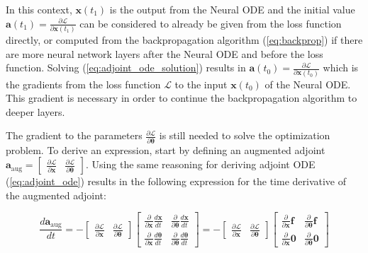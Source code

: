 \documentclass[12pt,a4paper]{book}
\begin{document}
In this context, $\bm{x}(t_1)$ is the output from the Neural ODE and the initial value $\bm{a}(t_1) = \frac{\partial \mathcal{L}}{\partial \bm{x}(t_1)}$ can be considered to already be given from the loss function directly, or computed from the backpropagation algorithm (\ref{eq:backprop}) if there are more neural network layers after the Neural ODE and before the loss function. Solving (\ref{eq:adjoint_ode_solution}) results in $\bm{a}(t_0) = \frac{\partial \mathcal{L}}{\partial \bm{x}(t_0)}$ which is the gradients from the loss function $\mathcal{L}$ to the input $\bm{x}(t_0)$ of the Neural ODE. This gradient is necessary in order to continue the backpropagation algorithm to deeper layers.

The gradient to the parameters $\frac{\partial \mathcal{L}}{\partial \bm{\theta}}$ is still needed to solve the optimization problem. To derive an expression, start by defining an augmented adjoint $\bm{a}_{\textrm{aug}} = \begin{bmatrix} \frac{\partial \mathcal{L}}{\partial \bm{x}} & \frac{\partial \mathcal{L}}{\partial \bm{\theta}} \end{bmatrix}$. Using the same reasoning for deriving adjoint ODE (\ref{eq:adjoint_ode}) results in the following expression for the time derivative of the augmented adjoint:

\begin{equation*}
    \frac{d \bm{a}_{\textrm{aug}}}{d t}
    = - \begin{bmatrix} \frac{\partial \mathcal{L}}{\partial \bm{x}} & \frac{\partial \mathcal{L}}{\partial \bm{\theta}} \end{bmatrix} \begin{bmatrix} \frac{\partial}{\partial \bm{x}} \frac{d \bm{x}}{d t} & \frac{\partial}{\partial \bm{\theta}} \frac{d \bm{x}}{d t} \\ \frac{\partial}{\partial \bm{x}} \frac{d \bm{\theta}}{d t} & \frac{\partial}{\partial \bm{\theta}} \frac{d \bm{\theta}}{d t} \end{bmatrix}
    = - \begin{bmatrix} \frac{\partial \mathcal{L}}{\partial \bm{x}} & \frac{\partial \mathcal{L}}{\partial \bm{\theta}} \end{bmatrix} \begin{bmatrix} \frac{\partial}{\partial \bm{x}} \bm{f} & \frac{\partial}{\partial \bm{\theta}} \bm{f} \\ \frac{\partial}{\partial \bm{x}} \bm{0} & \frac{\partial}{\partial \bm{\theta}} \bm{0} \end{bmatrix}
\end{equation*}
\end{document}
